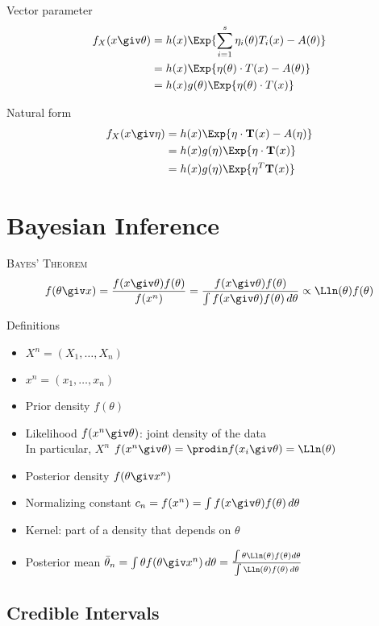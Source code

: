 \documentclass[landscape]{article}
\begin{document}
\begin{multicols*}{2}
Vector parameter
\begin{align*}
f_X(x \giv \theta)
&= h(x) \Exp{\sum_{i=1}^s\eta_i(\theta)T_i(x) - A(\theta)} \\
&= h(x) \Exp{\eta(\theta)\cdot T(x) - A(\theta)} \\
&= h(x) g(\theta)\Exp{\eta(\theta)\cdot T(x)}
\end{align*}

Natural form
\begin{align*}
f_X(x \giv \eta)
&= h(x) \Exp{\eta\cdot \mathbf{T}(x) - A(\eta)} \\
&= h(x) g(\eta) \Exp{\eta\cdot \mathbf{T}(x)} \\
&= h(x) g(\eta) \Exp{\eta^T \mathbf{T}(x)}
\end{align*}

\section{Bayesian Inference}

\textsc{Bayes' Theorem}
\[f(\theta\giv x)
= \frac{f(x\giv\theta)f(\theta)}{f(x^n)}
= \frac{f(x\giv\theta)f(\theta)}
       {\int f(x\giv\theta)f(\theta)\,d\theta} \propto \Lln(\theta)f(\theta)\]

Definitions
\begin{itemize}
  \item $X^n = (X_1,\ldots,X_n)$
  \item $x^n = (x_1,\ldots,x_n)$
  \item Prior density $f(\theta)$
  \item Likelihood $f(x^n \giv \theta)$: joint density of the data\\
    In particular, $X^n$ \iid \imp $f(x^n\giv\theta) =
    \displaystyle\prodin f(x_i\giv\theta) = \Lln(\theta)$
  \item Posterior density $f(\theta\giv x^n)$
  \item Normalizing constant $c_n = f(x^n)
    = \int f(x\giv\theta)f(\theta)\,d\theta$
  \item Kernel: part of a density that depends on $\theta$
  \item Posterior mean $\bar\theta_n
    = \int\theta f(\theta\giv x^n)\,d\theta
    = \frac{\int\theta\Lln(\theta)f(\theta)d\theta}
           {\int\Lln(\theta)f(\theta)\,d\theta}$
\end{itemize}

\subsection{Credible Intervals}


\end{multicols*}
\end{document}
